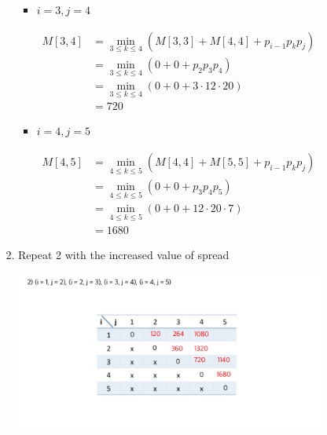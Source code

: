 \documentclass[12pt]{article}
\begin{document}
\begin{enumerate}[1.]
\begin{itemize}
\begin{itemize}
\begin{enumerate}[1.]
\begin{enumerate}[1)]
\begin{itemize}
                        \item $i = 3, j = 4$

                        \begin{align}
                            M[3,4] &= \min_{3 \leq k \leq 4} (M[3,3] + M[4,4] + p_{i-1}p_kp_j)\\
                            &= \min_{3 \leq k \leq 4} (0 + 0 + p_2p_3p_4)\\
                            &= \min_{3 \leq k \leq 4} (0 + 0 + 3 \cdot 12 \cdot 20)\\
                            &= 720
                        \end{align}

                        \item $i = 4, j = 5$

                        \begin{align}
                            M[4,5] &= \min_{4 \leq k \leq 5} (M[4,4] + M[5,5] + p_{i-1}p_kp_j)\\
                            &= \min_{4 \leq k \leq 5} (0 + 0 + p_3p_4p_5)\\
                            &= \min_{4 \leq k \leq 5} (0 + 0 + 12 \cdot 20 \cdot 7)\\
                            &= 1680
                        \end{align}
                    \end{itemize}

                    \item Repeat 2 with the increased value of spread

                    \begin{center}
                    \includegraphics[width=\linewidth]{images/worksheet_3_solution_4.png}
                    \end{center}


\end{enumerate}
\end{enumerate}
\end{itemize}
\end{itemize}
\end{enumerate}
\end{document}
